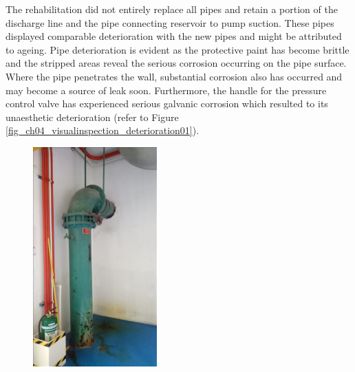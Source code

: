 The rehabilitation did not entirely replace all pipes and retain a portion of the discharge line and the pipe connecting reservoir to pump suction. These pipes displayed comparable deterioration with the new pipes and might be attributed to ageing. Pipe deterioration is evident as the protective paint has become brittle and the stripped areas reveal the serious corrosion occurring on the pipe surface. Where the pipe penetrates the wall, substantial corrosion also has occurred and may become a source of leak soon. Furthermore, the handle for the pressure control valve has experienced serious galvanic corrosion which resulted to its unaesthetic deterioration (refer to Figure \ref{fig_ch04_visualinspection_deterioration01}). 

\begin{figure}[!htb]
	\begin{minipage}[b]{0.15\linewidth}
		\centering
		\includegraphics[width=\textwidth]{figures/ch043_discharge_pipe_deteriorationA}

\end{minipage}
\end{figure}
